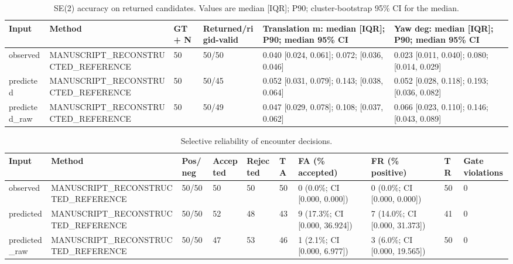


\begin{table}[t]
\centering
\small
\caption{SE(2) accuracy on returned candidates. Values are median [IQR]; P90; cluster-bootstrap 95\% CI for the median.}
\label{tab:transform-accuracy}
\begin{tabular}{llllll}
\toprule
Input & Method & GT+ N & Returned/rigid-valid & Translation m: median [IQR]; P90; median 95\% CI & Yaw deg: median [IQR]; P90; median 95\% CI \\
\midrule
observed & MANUSCRIPT\_RECONSTRUCTED\_REFERENCE & 50 & 50/50 & 0.040 [0.024, 0.061]; 0.072; [0.036, 0.046] & 0.023 [0.011, 0.040]; 0.080; [0.014, 0.029] \\
predicted & MANUSCRIPT\_RECONSTRUCTED\_REFERENCE & 50 & 50/45 & 0.052 [0.031, 0.079]; 0.143; [0.038, 0.064] & 0.052 [0.028, 0.118]; 0.193; [0.036, 0.082] \\
predicted\_raw & MANUSCRIPT\_RECONSTRUCTED\_REFERENCE & 50 & 50/49 & 0.047 [0.029, 0.078]; 0.108; [0.037, 0.062] & 0.066 [0.023, 0.110]; 0.146; [0.043, 0.089] \\
\bottomrule
\end{tabular}
\end{table}

\begin{table}[t]
\centering
\small
\caption{Selective reliability of encounter decisions.}
\label{tab:transform-reliability}
\begin{tabular}{llllllllll}
\toprule
Input & Method & Pos/neg & Accepted & Rejected & TA & FA (\% accepted) & FR (\% positive) & TR & Gate violations \\
\midrule
observed & MANUSCRIPT\_RECONSTRUCTED\_REFERENCE & 50/50 & 50 & 50 & 50 & 0 (0.0\%; CI [0.000, 0.000]) & 0 (0.0\%; CI [0.000, 0.000]) & 50 & 0 \\
predicted & MANUSCRIPT\_RECONSTRUCTED\_REFERENCE & 50/50 & 52 & 48 & 43 & 9 (17.3\%; CI [0.000, 36.924]) & 7 (14.0\%; CI [0.000, 31.373]) & 41 & 0 \\
predicted\_raw & MANUSCRIPT\_RECONSTRUCTED\_REFERENCE & 50/50 & 47 & 53 & 46 & 1 (2.1\%; CI [0.000, 6.977]) & 3 (6.0\%; CI [0.000, 19.565]) & 50 & 0 \\
\bottomrule
\end{tabular}
\end{table}
